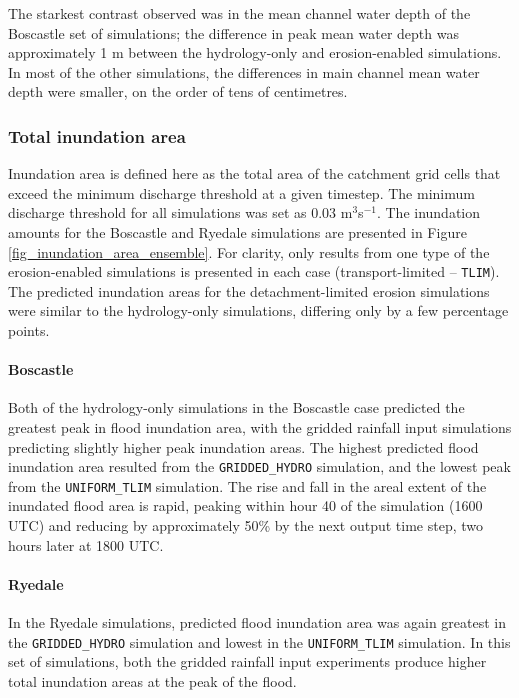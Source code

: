 The starkest contrast observed was in the mean channel water depth of the Boscastle set of simulations; the difference in peak mean water depth was approximately 1 m between the hydrology-only and erosion-enabled simulations. In most of the other simulations, the differences in main channel mean water depth were smaller, on the order of tens of centimetres.

\subsubsection{Total inundation area}
Inundation area is defined here as the total area of the catchment grid cells that exceed the minimum discharge threshold at a given timestep. The minimum discharge threshold for all simulations was set as 0.03 m\(^3\)s\(^{-1}\). The inundation amounts for the Boscastle and Ryedale simulations are presented in Figure \ref{fig_inundation_area_ensemble}. For clarity, only results from one type of the erosion-enabled simulations is presented in each case (transport-limited -- \texttt{TLIM}). The predicted inundation areas for the detachment-limited erosion simulations were similar to the hydrology-only simulations, differing only by a few percentage points.

\paragraph{Boscastle}
Both of the hydrology-only simulations in the Boscastle case predicted the greatest peak in flood inundation area, with the gridded rainfall input simulations predicting slightly higher peak inundation areas. The highest predicted flood inundation area resulted from the \texttt{GRIDDED\_HYDRO} simulation, and the lowest peak from the \texttt{UNIFORM\_TLIM} simulation. The rise and fall in the areal extent of the inundated flood area is rapid, peaking within hour 40 of the simulation  (1600 UTC) and reducing by approximately 50\% by the next output time step, two hours later at 1800 UTC. 

\paragraph{Ryedale}
In the Ryedale simulations, predicted flood inundation area was again greatest in the \texttt{GRIDDED\_HYDRO} simulation and lowest in the \texttt{UNIFORM\_TLIM} simulation. In this set of simulations, both the gridded rainfall input experiments produce higher total inundation areas at the peak of the flood.

